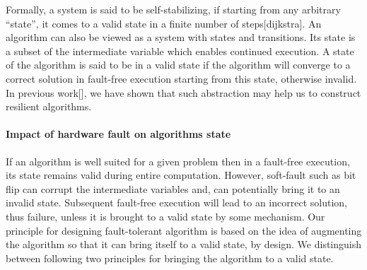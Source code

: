 
\textbf{\emph{}}%

Formally, a system is said to be self-stabilizing, if starting from
any arbitrary \textquotedblleft state\textquotedblright , it comes
to a valid state in a finite number of steps{[}dijkstra{]}. An algorithm
can also be viewed as a system with states and transitions. Its state
is a subset of the intermediate variable which enables continued execution.
A state of the algorithm is said to be in a valid state if the algorithm
will converge to a correct solution in fault-free execution starting
from this state, otherwise invalid. In previous work{[}{]}, we have
shown that such abstraction may help us to construct resilient algorithms. 



\paragraph{Impact of hardware fault on algorithms state}

If an algorithm is well suited for a given problem then in a fault-free
execution, its state remains valid during entire computation. However,
soft-fault such as bit flip can corrupt the intermediate variables
and, can potentially bring it to an invalid state. Subsequent fault-free
execution will lead to an incorrect solution, thus failure, unless
it is brought to a valid state by some mechanism. Our principle for
designing fault-tolerant algorithm is based on the idea of augmenting
the algorithm so that it can bring itself to a valid state, by design.
We distinguish between following two principles for bringing the algorithm
to a valid state.

